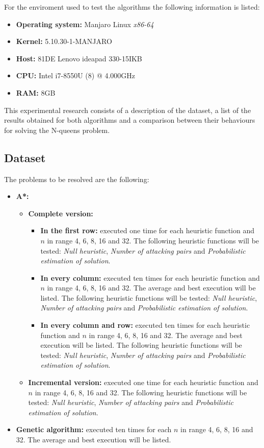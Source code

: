 \documentclass[]{llncs}
\begin{document}
For the enviroment used to test the algorithms the following information is listed:
\begin{itemize}
    \item \textbf{Operating system:} Manjaro Linux \textit{x86-64}
    \item \textbf{Kernel:} 5.10.30-1-MANJARO
    \item \textbf{Host:} 81DE Lenovo ideapad 330-15IKB
    \item \textbf{CPU:} Intel i7-8550U (8) @ 4.000GHz
    \item \textbf{RAM:} 8GB
\end{itemize}

This experimental research consists of a description of the dataset, a list of the results obtained for both algorithms and a comparison between their behaviours for solving the N-queens problem.
\subsection{Dataset}\label{dataset}
The problems to be resolved are the following:
\begin{itemize}
    \item \textbf{A*:}
        \begin{itemize}
            \item \textbf{Complete version:}
                \begin{itemize}
                    \item \textbf{In the first row:} executed one time for each heuristic function and $n$ in range 4, 6, 8, 16 and 32. The following heuristic functions will be tested: \textit{Null heuristic}, \textit{Number of attacking pairs} and \textit{Probabilistic estimation of solution}.
                    \item \textbf{In every column:} executed ten times for each heuristic function and $n$ in range 4, 6, 8, 16 and 32. The average and best execution will be listed. The following heuristic functions will be tested: \textit{Null heuristic}, \textit{Number of attacking pairs} and \textit{Probabilistic estimation of solution}.
                    \item \textbf{In every column and row:} executed ten times for each heuristic function and $n$ in range 4, 6, 8, 16 and 32. The average and best execution will be listed. The following heuristic functions will be tested: \textit{Null heuristic}, \textit{Number of attacking pairs} and \textit{Probabilistic estimation of solution}.
                \end{itemize}
            \item \textbf{Incremental version:} executed one time for each heuristic function and $n$ in range 4, 6, 8, 16 and 32. The following heuristic functions will be tested: \textit{Null heuristic}, \textit{Number of attacking pairs} and \textit{Probabilistic estimation of solution}.
        \end{itemize}
    \item \textbf{Genetic algorithm:} executed ten times for each $n$ in range 4, 6, 8, 16 and 32. The average and best execution will be listed.
\end{itemize}
\end{document}
